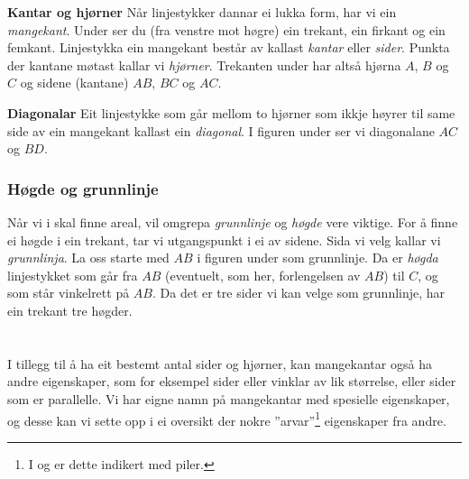 \begin{comment}
\reg[Samsvarande vinklar]{
	Vinkler med eit høgre eller venstre vinkelbein felles, kallast \textit{samsvarende vinkler}. I figuren under er dei markerte vinklane samsvarande fordi alle tre har den raude linja som venstre vinkelbein.
\fig{vink4}
	Vinklar med parvis parallelle høgre og venstre vinkelbein er like store.
\fig{vink4b}
}
\end{comment}
\newpage
\textbf{Kantar og hjørner} \os
Når linjestykker dannar ei lukka form, har vi ein \textit{mangekant}. Under ser du (fra venstre mot høgre) ein trekant, ein firkant og ein femkant.
Linjestykka ein mangekant består av kallast \textit{kantar} eller \textit{sider}. Punkta der kantane møtast kallar vi \textit{hjørner}. Trekanten under har altså hjørna $ A $, $ B $ og $ C $ og sidene (kantane) $ AB $, $ BC $ og $ AC $.
 \vsk

\textbf{Diagonalar} \os
Eit linjestykke som går mellom to hjørner som ikkje høyrer til same side av ein mangekant kallast ein \textit{diagonal}. I figuren under ser vi diagonalane $ AC $ og $ BD $.
\newpage
\subsubsection{Høgde og grunnlinje}
Når vi i  skal finne areal, vil omgrepa \textit{grunnlinje} og \textit{høgde} vere viktige. For å finne ei høgde i ein trekant, tar vi utgangspunkt i ei av sidene. Sida vi velg kallar vi \textit{grunnlinja}. La oss starte med $ AB $ i figuren under som grunnlinje. Da er \textit{høgda} linjestykket som går fra $ AB $ (eventuelt, som her, forlengelsen av $ AB $) til $ C $, og som står vinkelrett på $ AB $.
Da det er tre sider vi kan velge som grunnlinje, har ein trekant tre høgder.
\section{\eignsk}
I tillegg til å ha eit bestemt antal sider og hjørner, kan mangekantar også ha andre eigenskaper, som for eksempel sider eller vinklar av lik størrelse, eller sider som er parallelle. Vi har eigne namn på mangekantar med spesielle eigenskaper, og desse kan vi sette opp i ei oversikt der nokre ''arvar''\footnote{I  og  er dette indikert med piler.} eigenskaper fra andre.\regv


